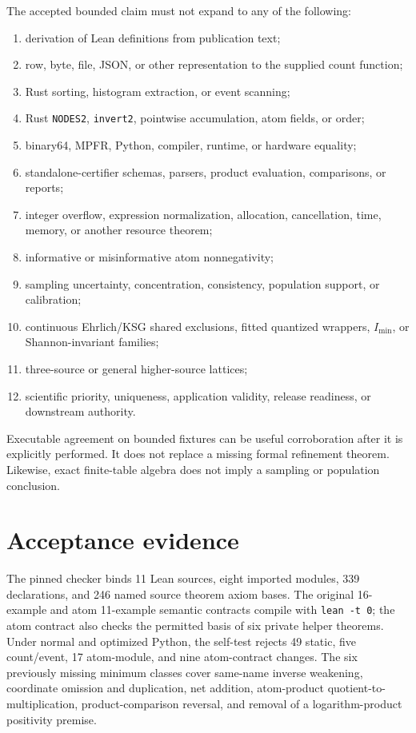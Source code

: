 \documentclass[11pt]{article}
\theoremstyle{definition}
\begin{document}
The accepted bounded claim must not expand
to any of the following:
\begin{enumerate}[leftmargin=*]
  \item derivation of Lean definitions from publication text;
  \item row, byte, file, JSON, or other representation to the supplied count function;
  \item Rust sorting, histogram extraction, or event scanning;
  \item Rust \texttt{NODES2}, \texttt{invert2}, pointwise accumulation, atom fields, or order;
  \item binary64, MPFR, Python, compiler, runtime, or hardware equality;
  \item standalone-certifier schemas, parsers, product evaluation, comparisons, or reports;
  \item integer overflow, expression normalization, allocation, cancellation, time, memory, or
        another resource theorem;
  \item informative or misinformative atom nonnegativity;
  \item sampling uncertainty, concentration, consistency, population support, or calibration;
  \item continuous Ehrlich/KSG shared exclusions, fitted quantized wrappers, \(I_{\min}\), or
        Shannon-invariant families;
  \item three-source or general higher-source lattices;
  \item scientific priority, uniqueness, application validity, release readiness, or downstream
        authority.
\end{enumerate}

Executable agreement on bounded fixtures can be useful corroboration after it is explicitly
performed.  It does not replace a missing formal refinement theorem.  Likewise, exact finite-table
algebra does not imply a sampling or population conclusion.

\section{Acceptance evidence}

The pinned checker binds 11 Lean sources, eight imported modules, 339 declarations, and 246 named
source theorem axiom bases.  The original 16-example and atom 11-example semantic contracts compile
with \texttt{lean -t 0}; the atom contract also checks the permitted basis of six private helper
theorems.  Under normal and optimized Python, the self-test rejects 49 static, five count/event,
17 atom-module, and nine atom-contract changes.  The six previously missing minimum classes cover
same-name inverse weakening, coordinate omission and duplication, net addition, atom-product
quotient-to-multiplication, product-comparison reversal, and removal of a logarithm-product
positivity premise.
\end{document}
